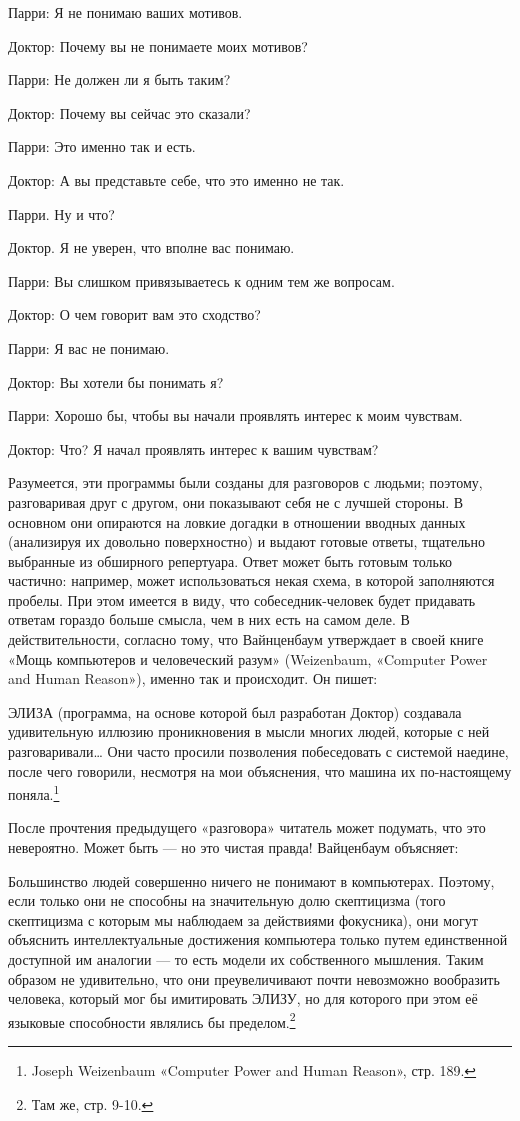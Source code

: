 \documentclass[../main.tex]{subfiles}
\begin{document}
Парри: Я не понимаю ваших мотивов.

Доктор: Почему вы не понимаете моих мотивов?

Парри: Не должен ли я быть таким?

Доктор: Почему вы сейчас это сказали?

Парри: Это именно так и есть.

Доктор: А вы представьте себе, что это именно не так.

Парри. Ну и что?

Доктор. Я не уверен, что вполне вас понимаю.

Парри: Вы слишком привязываетесь к одним тем же вопросам.

Доктор: О чем говорит вам это сходство?

Парри: Я вас не понимаю.

Доктор: Вы хотели бы понимать я?

Парри: Хорошо бы, чтобы вы начали проявлять интерес к моим чувствам.

Доктор: Что? Я начал проявлять интерес к вашим чувствам?

Разумеется, эти программы были созданы для разговоров с людьми; поэтому, разговаривая друг с другом, они показывают себя не с лучшей стороны. В основном они опираются на ловкие догадки в отношении вводных данных (анализируя их довольно поверхностно) и выдают готовые ответы, тщательно выбранные из обширного репертуара. Ответ может быть готовым только частично: например, может использоваться некая схема, в которой заполняются пробелы. При этом имеется в виду, что собеседник-человек будет придавать ответам гораздо больше смысла, чем в них есть на самом деле. В действительности, согласно тому, что Вайнценбаум утверждает в своей книге «Мощь компьютеров и человеческий разум» (Weizenbaum, «Computer Power and Human Reason»), именно так и происходит. Он пишет:

ЭЛИЗА (программа, на основе которой был разработан Доктор) создавала удивительную иллюзию проникновения в мысли многих людей, которые с ней разговаривали\ldots{} Они часто просили позволения побеседовать с системой наедине, после чего говорили, несмотря на мои объяснения, что машина их по-настоящему поняла.\footnote{Joseph Weizenbaum «Computer Power and Human Reason», стр. 189.}

После прочтения предыдущего «разговора» читатель может подумать, что это невероятно. Может быть --- но это чистая правда! Вайценбаум объясняет:

Большинство людей совершенно ничего не понимают в компьютерах. Поэтому, если только они не способны на значительную долю скептицизма (того скептицизма с которым мы наблюдаем за действиями фокусника), они могут объяснить интеллектуальные достижения компьютера только путем единственной доступной им аналогии --- то есть модели их собственного мышления. Таким образом не удивительно, что они преувеличивают почти невозможно вообразить человека, который мог бы имитировать ЭЛИЗУ, но для которого при этом её языковые способности являлись бы пределом.\footnote{Там же, стр. 9-10.}
\end{document}
